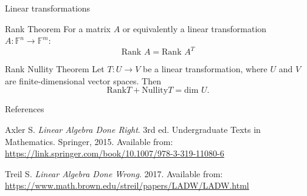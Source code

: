 \documentclass [aspectratio=169]{beamer}
\newcommand{\F}{{\mathds{F}}}
\begin{document}
\begin{frame}{Linear transformations}
\begin{exampleblock}{Rank Theorem}
For a matrix $A$ or equivalently a linear transformation $A: \F^n \to \F^m$:
\begin{equation*}
\text{Rank } A = \text{Rank }  A^T 
\end{equation*}
\end{exampleblock}

\begin{exampleblock}{Rank Nullity Theorem}
Let $T:U \to V$ be a linear transformation, where $U$ and $V$ are finite-dimensional vector spaces. Then  
\begin{equation*}
\text{Rank} T + \text{Nullity}  T = \text{dim } U.
\end{equation*}
\end{exampleblock}

\end{frame}



\begin{frame}{References}

Axler S. \textit{Linear Algebra Done Right}. 3rd ed. Undergraduate Texts in Mathematics. Springer, 2015.
Available from: \href{https://link.springer.com/book/10.1007/978-3-319-11080-6}{https://link.springer.com/book/10.1007/978-3-319-11080-6} 

\vspace{1em}


\indent Treil S. \textit{Linear Algebra Done Wrong}. 2017. Available from: \href{https://www.math.brown.edu/streil/papers/LADW/LADW.html}{https://www.math.brown.edu/streil/papers/LADW/LADW.html}
\end{frame}
\end{document}
